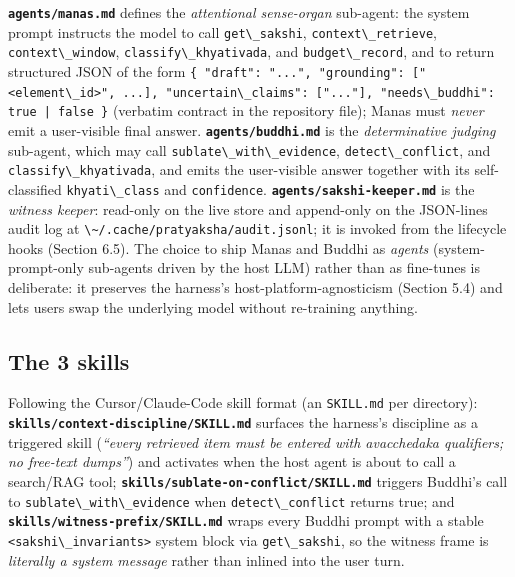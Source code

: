 \textbf{\passthrough{\lstinline!agents/manas.md!}} defines the \emph{attentional sense-organ} sub-agent: the system prompt instructs the model to call \passthrough{\lstinline!get\_sakshi!}, \passthrough{\lstinline!context\_retrieve!}, \passthrough{\lstinline!context\_window!}, \passthrough{\lstinline!classify\_khyativada!}, and \passthrough{\lstinline!budget\_record!}, and to return structured JSON of the form \passthrough{\lstinline!\{ "draft": "...", "grounding": ["<element\_id>", ...], "uncertain\_claims": ["..."], "needs\_buddhi": true | false \}!} (verbatim contract in the repository file); Manas must \emph{never} emit a user-visible final answer. \textbf{\passthrough{\lstinline!agents/buddhi.md!}} is the \emph{determinative judging} sub-agent, which may call \passthrough{\lstinline!sublate\_with\_evidence!}, \passthrough{\lstinline!detect\_conflict!}, and \passthrough{\lstinline!classify\_khyativada!}, and emits the user-visible answer together with its self-classified \passthrough{\lstinline!khyati\_class!} and \passthrough{\lstinline!confidence!}. \textbf{\passthrough{\lstinline!agents/sakshi-keeper.md!}} is the \emph{witness keeper}: read-only on the live store and append-only on the JSON-lines audit log at \passthrough{\lstinline!\~/.cache/pratyaksha/audit.jsonl!}; it is invoked from the lifecycle hooks (Section 6.5). The choice to ship Manas and Buddhi as \emph{agents} (system-prompt-only sub-agents driven by the host LLM) rather than as fine-tunes is deliberate: it preserves the harness's host-platform-agnosticism (Section 5.4) and lets users swap the underlying model without re-training anything.

\subsection{The 3 skills}\label{the-3-skills}

Following the Cursor/Claude-Code skill format (an \passthrough{\lstinline!SKILL.md!} per directory): \textbf{\passthrough{\lstinline!skills/context-discipline/SKILL.md!}} surfaces the harness's discipline as a triggered skill (\emph{``every retrieved item must be entered with avacchedaka qualifiers; no free-text dumps''}) and activates when the host agent is about to call a search/RAG tool; \textbf{\passthrough{\lstinline!skills/sublate-on-conflict/SKILL.md!}} triggers Buddhi's call to \passthrough{\lstinline!sublate\_with\_evidence!} when \passthrough{\lstinline!detect\_conflict!} returns true; and \textbf{\passthrough{\lstinline!skills/witness-prefix/SKILL.md!}} wraps every Buddhi prompt with a stable \passthrough{\lstinline!<sakshi\_invariants>!} system block via \passthrough{\lstinline!get\_sakshi!}, so the witness frame is \emph{literally a system message} rather than inlined into the user turn.

